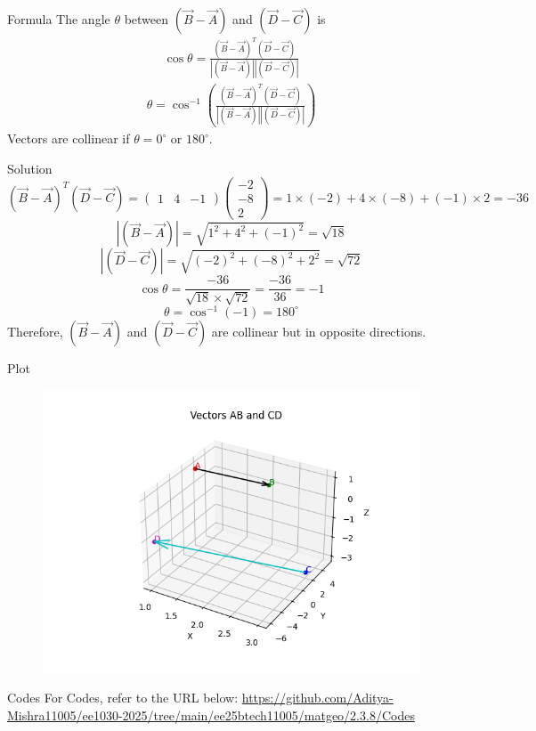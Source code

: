 \documentclass{beamer}
\begin{document}
\begin{frame}{Formula}
The angle $\theta$ between $(\vec{B}-\vec{A})$ and $(\vec{D}-\vec{C})$ is
\begin{align}
\cos \theta = \frac{(\vec{B}-\vec{A})^T (\vec{D}-\vec{C})}
{|(\vec{B}-\vec{A})| |(\vec{D}-\vec{C})|}
\end{align}
\begin{align}
\theta = \cos^{-1}\left(
\frac{(\vec{B}-\vec{A})^T (\vec{D}-\vec{C})}
{|(\vec{B}-\vec{A})| |(\vec{D}-\vec{C})|}\right)
\end{align}
Vectors are collinear if $\theta = 0^\circ$ or $180^\circ$.
\end{frame}
\begin{frame}{Solution}
\[
(\vec{B}-\vec{A})^T (\vec{D}-\vec{C})
= \begin{pmatrix}1 & 4 & -1\end{pmatrix}
\begin{pmatrix}-2 \\ -8 \\ 2\end{pmatrix}
= 1\times(-2) + 4\times(-8) + (-1)\times 2 = -36
\]
\[
|(\vec{B}-\vec{A})| = \sqrt{1^2 + 4^2 + (-1)^2} = \sqrt{18}
\]
\[
|(\vec{D}-\vec{C})| = \sqrt{(-2)^2 + (-8)^2 + 2^2} = \sqrt{72}
\]
\[
\cos\theta = \frac{-36}{\sqrt{18} \times \sqrt{72}} = \frac{-36}{36} = -1
\]
\[
\theta = \cos^{-1}(-1) = 180^\circ
\]
Therefore, $(\vec{B}-\vec{A})$ and $(\vec{D}-\vec{C})$ are collinear but in opposite directions.
\end{frame}
\begin{frame}{Plot}
\begin{figure}
    \centering
    \includegraphics[width=0.8\columnwidth]{Figs/Figure.png}
\end{figure}
\end{frame}
\begin{frame}{Codes}
\centering
    For Codes, refer to the URL below:
	\url{https://github.com/Aditya-Mishra11005/ee1030-2025/tree/main/ee25btech11005/matgeo/2.3.8/Codes}
\end{frame}
\end{document}
